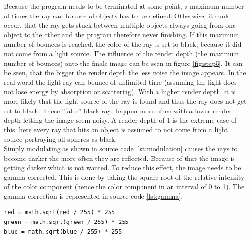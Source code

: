 \documentclass[12pt]{report}
\begin{document}
Because the program needs to be terminated at some point, a maximum number of times the ray can bounce of objects has to be defined. Otherwise, it could occur, that the ray gets stuck between multiple objects always going from one object to the other and the program therefore never finishing. If this maximum number of bounces is reached, the color of the ray is set to black, because it did not come from a light source. The influence of the render depth (the maximum number of bounces) onto the finale image can be seen in figure \ref{fig:step5}. It can be seen, that the bigger the render depth the less noise the image appears. In the real world the light ray can bounce of unlimited time (assuming the light does not lose energy by absorption or scattering). With a higher render depth, it is more likely that the light source of the ray is found and thus the ray does not get set to black. These ''false'' black rays happen more often with a lower render depth letting the image seem noisy. A render depth of 1 is the extreme case of this, here every ray that hits an object is assumed to not come from a light source portraying all spheres as black. \\
Simply modulating as shown in source code \ref{lst:modulation} causes the rays to become darker the more often they are reflected. Because of that the image is getting darker which is not wanted. To reduce this effect, the image needs to be gamma corrected. This is done by taking the square root of the relative intensity of the color component (hence the color component in an interval of 0 to 1). The gamma correction is represented in source code \ref{lst:gamma}.
\begin{lstlisting}[caption={Gamma correction}, label=lst:gamma, style=mystyle]
red = math.sqrt(red / 255) * 255
green = math.sqrt(green / 255) * 255
blue = math.sqrt(blue / 255) * 255
\end{lstlisting}
\end{document}
